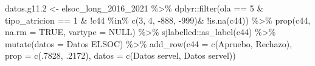 \documentclass[
  12pt,
]{book}
\newenvironment{Shaded}{\begin{snugshade}}{\end{snugshade}}
\newcommand{\AttributeTok}[1]{\textcolor[rgb]{0.77,0.63,0.00}{#1}}
\newcommand{\ConstantTok}[1]{\textcolor[rgb]{0.00,0.00,0.00}{#1}}
\newcommand{\DecValTok}[1]{\textcolor[rgb]{0.00,0.00,0.81}{#1}}
\newcommand{\FloatTok}[1]{\textcolor[rgb]{0.00,0.00,0.81}{#1}}
\newcommand{\FunctionTok}[1]{\textcolor[rgb]{0.00,0.00,0.00}{#1}}
\newcommand{\NormalTok}[1]{#1}
\newcommand{\OtherTok}[1]{\textcolor[rgb]{0.56,0.35,0.01}{#1}}
\newcommand{\SpecialCharTok}[1]{\textcolor[rgb]{0.00,0.00,0.00}{#1}}
\newcommand{\StringTok}[1]{\textcolor[rgb]{0.31,0.60,0.02}{#1}}
\begin{document}
\begin{Shaded}
\begin{Highlighting}[]
\NormalTok{datos.g11}\FloatTok{.2} \OtherTok{\textless{}{-}}\NormalTok{ elsoc\_long\_2016\_2021 }\SpecialCharTok{\%\textgreater{}\%} 
\NormalTok{  dplyr}\SpecialCharTok{::}\FunctionTok{filter}\NormalTok{(ola }\SpecialCharTok{==} \DecValTok{5} \SpecialCharTok{\&}\NormalTok{ tipo\_atricion }\SpecialCharTok{==} \DecValTok{1} \SpecialCharTok{\&} \SpecialCharTok{!}\NormalTok{c44 }\SpecialCharTok{\%in\%} \FunctionTok{c}\NormalTok{(}\DecValTok{3}\NormalTok{, }\DecValTok{4}\NormalTok{, }\SpecialCharTok{{-}}\DecValTok{888}\NormalTok{, }\SpecialCharTok{{-}}\DecValTok{999}\NormalTok{)}\SpecialCharTok{\&} \SpecialCharTok{!}\FunctionTok{is.na}\NormalTok{(c44)) }\SpecialCharTok{\%\textgreater{}\%} 
  \FunctionTok{prop}\NormalTok{(c44, }\AttributeTok{na.rm =} \ConstantTok{TRUE}\NormalTok{, }\AttributeTok{vartype =} \ConstantTok{NULL}\NormalTok{) }\SpecialCharTok{\%\textgreater{}\%} 
\NormalTok{  sjlabelled}\SpecialCharTok{::}\FunctionTok{as\_label}\NormalTok{(c44) }\SpecialCharTok{\%\textgreater{}\%} 
  \FunctionTok{mutate}\NormalTok{(}\AttributeTok{datos =} \StringTok{\textquotesingle{}Datos ELSOC\textquotesingle{}}\NormalTok{) }\SpecialCharTok{\%\textgreater{}\%}
  \FunctionTok{add\_row}\NormalTok{(}\AttributeTok{c44 =} \FunctionTok{c}\NormalTok{(}\StringTok{\textquotesingle{}Apruebo\textquotesingle{}}\NormalTok{, }\StringTok{\textquotesingle{}Rechazo\textquotesingle{}}\NormalTok{), }\AttributeTok{prop =} \FunctionTok{c}\NormalTok{(.}\DecValTok{7828}\NormalTok{, .}\DecValTok{2172}\NormalTok{), }\AttributeTok{datos =} \FunctionTok{c}\NormalTok{(}\StringTok{\textquotesingle{}Datos servel\textquotesingle{}}\NormalTok{, }\StringTok{\textquotesingle{}Datos servel\textquotesingle{}}\NormalTok{))}


\end{Highlighting}
\end{Shaded}
\end{document}
